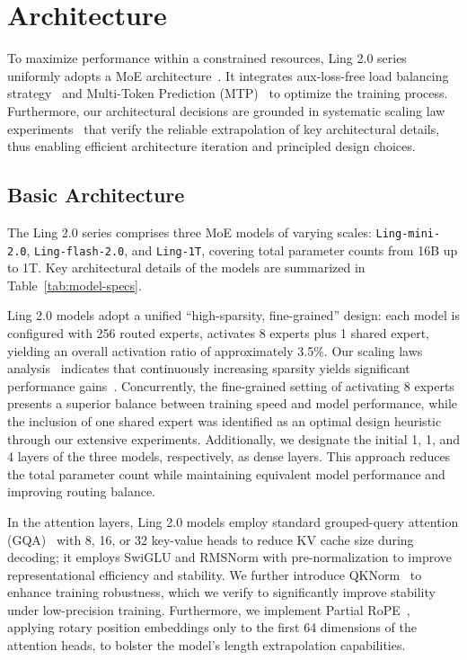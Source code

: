 \documentclass[table]{gtech}
\theoremstyle{definition}
\begin{document}
\section{Architecture}
\label{sec:Architecture}
To maximize performance within a constrained resources, Ling 2.0 series uniformly adopts a MoE architecture~\citep{shazeer2017outrageously,deepseekai2024deepseekv3technicalreport}. It integrates aux-loss-free load balancing strategy~\citep{deepseekai2024deepseekv3technicalreport} and Multi-Token Prediction (MTP)~\citep{gloeckle2024better,deepseekai2024deepseekv3technicalreport} to optimize the training process. Furthermore, our architectural decisions are grounded in systematic scaling law experiments~\citep{tian2025greaterleveragescalinglaws} that verify the reliable extrapolation of key architectural details, thus enabling efficient architecture iteration and principled design choices. 

\subsection{Basic Architecture}
\label{sec:basic_arch}
The Ling 2.0 series comprises three MoE models of varying scales: \texttt{Ling-mini-2.0}, \texttt{Ling-flash-2.0}, and \texttt{Ling-1T}, covering total parameter counts from 16B up to 1T. Key architectural details of the models are summarized in Table~\ref{tab:model-specs}.

Ling 2.0 models adopt a unified ``high-sparsity, fine-grained'' design: each model is configured with 256 routed experts, activates 8 experts plus 1 shared expert, yielding an overall activation ratio of approximately 3.5\%. Our scaling laws analysis~\citep{tian2025greaterleveragescalinglaws} indicates that continuously increasing sparsity yields significant performance gains~\citep{kimiK2}. Concurrently, the fine-grained setting of activating 8 experts presents a superior balance between training speed and model performance, while the inclusion of one shared expert was identified as an optimal design heuristic through our extensive experiments. Additionally, we designate the initial 1, 1, and 4 layers of the three models, respectively, as dense layers. This approach reduces the total parameter count while maintaining equivalent model performance and improving routing balance. 

In the attention layers, Ling 2.0 models employ standard grouped-query attention (GQA)~\citep{ainslie2023gqa} with 8, 16, or 32 key-value heads to reduce KV cache size during decoding; it employs SwiGLU and RMSNorm with pre-normalization to improve representational efficiency and stability. We further introduce QKNorm~\citep{henry2020query} to enhance training robustness, which we verify to significantly improve stability under low-precision training. Furthermore, we implement Partial RoPE~\citep{su2024roformer}, applying rotary position embeddings only to the first 64 dimensions of the attention heads, to bolster the model's length extrapolation capabilities. 
\end{document}
